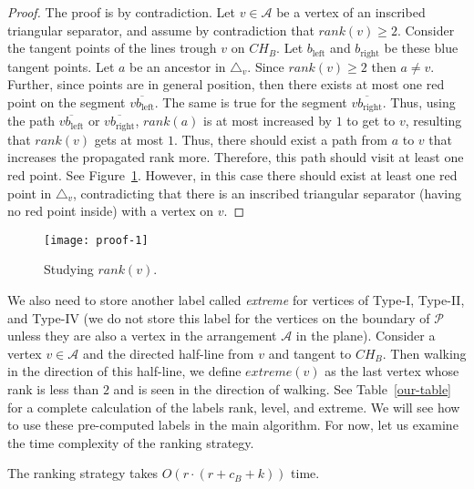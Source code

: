 \documentclass[a4paper,UKenglish]{lipics-v2018}
\theoremstyle{definition}
\begin{document}
\begin{proof}
The proof is by contradiction. Let $v \in \mathcal{A}$ be a vertex of an inscribed triangular separator, and assume by contradiction that $rank(v) \geq 2$. Consider the tangent points of the lines trough $v$ on $CH_B$. Let $b_{\mathrm{left}}$ and $b_{\mathrm{right}}$ be these blue tangent points. Let $a$ be an ancestor in $\triangle_v$. Since $rank(v) \geq 2$ then $a \neq v$. Further, since points are in general position, then there exists at most one red point on the segment $\overline{vb_{\mathrm{left}}}$. The same is true for the segment $\overline{vb_{\mathrm{right}}}$. Thus, using the path $\overline{vb_{\mathrm{left}}}$ or $\overline{vb_{\mathrm{right}}}$, $rank(a)$ is at most increased by $1$ to get to $v$, resulting that $rank(v)$ gets at most $1$. Thus, there should exist a path from $a$ to $v$ that increases the propagated rank more. Therefore, this path should visit at least one red point. See Figure~\ref{proof-1}. However, in this case there should exist at least one red point in $\triangle_v$, contradicting that there is an inscribed triangular separator (having no red point inside) with a vertex on $v$.
\end{proof}
\begin{figure}[h]
\centering
\texttt{[image: proof-1]}
\caption{Studying $rank(v)$.}
\label{proof-1}
\end{figure}

We also need to store another label called \emph{extreme} for vertices of Type-I, Type-II, and Type-IV (we do not store this label for the vertices on the boundary of $\mathcal P$ unless they are also a vertex in the arrangement $\mathcal A$ in the plane). Consider a vertex $v \in \mathcal A$ and the directed half-line from $v$ and tangent to $CH_B$. Then walking in the direction of this half-line, we define $extreme(v)$ as the last vertex whose rank is less than $2$ and is seen in the direction of walking. See Table~\ref{our-table} for a complete calculation of the labels rank, level, and extreme. We will see how to use these pre-computed labels in the main algorithm. For now, let us examine the time complexity of the ranking strategy.

\begin{theorem}
The ranking strategy takes $O(r \cdot (r+c_B+k))$ time.
\end{theorem}
\end{document}
